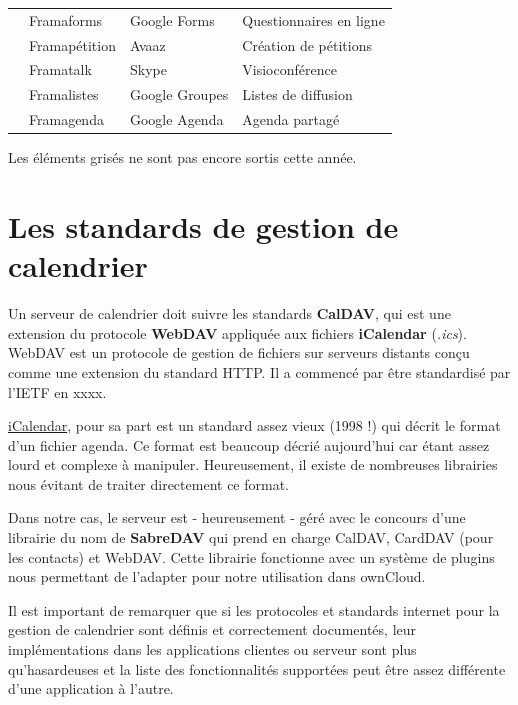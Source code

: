 \documentclass[10pt,a4paper, twoside]{report}
\begin{document}
{\begin{tabular}{|c|l|l|l|}
		\cline{2-4}
		& \cellcolor{lightgray}Framaforms & \cellcolor{lightgray}Google Forms & \cellcolor{lightgray}Questionnaires en ligne \\
		\cline{2-4}
		& \cellcolor{lightgray}Framapétition & \cellcolor{lightgray}Avaaz & \cellcolor{lightgray}Création de pétitions \\
		\cline{2-4}
		& \cellcolor{lightgray}Framatalk & \cellcolor{lightgray}Skype & \cellcolor{lightgray}Visioconférence \\
		\cline{2-4}
		& \cellcolor{lightgray}Framalistes & \cellcolor{lightgray}Google Groupes & \cellcolor{lightgray}Listes de diffusion \\
		\cline{2-4}
		& \cellcolor{lightgray}Framagenda & \cellcolor{lightgray}Google Agenda & \cellcolor{lightgray}Agenda partagé \\
		\hline 
		\end{tabular}}
	
	Les éléments grisés ne sont pas encore sortis cette année.
	\section{Les standards de gestion de calendrier}
	Un serveur de calendrier doit suivre les standards \textbf{CalDAV}, qui est une extension du protocole \textbf{WebDAV} appliquée aux fichiers \textbf{iCalendar} (\textit{.ics}). WebDAV est un protocole de gestion de fichiers sur serveurs distants conçu comme une extension du standard HTTP. Il a commencé par être standardisé par l'IETF en xxxx.
	
	\href{https://tools.ietf.org/html/rfc2445}{iCalendar}, pour sa part est un standard assez vieux (1998 !) qui décrit le format d'un fichier agenda. Ce format est beaucoup décrié aujourd'hui car étant assez lourd et complexe à manipuler. Heureusement, il existe de nombreuses librairies nous évitant de traiter directement ce format.
	
	Dans notre cas, le serveur est - heureusement - géré avec le concours d'une librairie du nom de \textbf{SabreDAV} qui prend en charge CalDAV, CardDAV (pour les contacts) et WebDAV. Cette librairie fonctionne avec un système de plugins nous permettant de l'adapter pour notre utilisation dans ownCloud.
	
	Il est important de remarquer que si les protocoles et standards internet pour la gestion de calendrier sont définis et correctement documentés, leur implémentations dans les applications clientes ou serveur sont plus qu'hasardeuses et la liste des fonctionnalités supportées peut être assez différente d'une application à l'autre.
	
\end{document}
